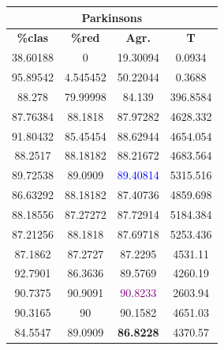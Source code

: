 \documentclass[11pt,a4paper]{article}
\theoremstyle{definition}
\begin{document}
\begin{tabbing}
{\begin{tabular}{|c|c|c|c|}
		\end{tabular}
		
		\begin{tabular}{|c|c|c|c|}
			\hline
			\multicolumn{4}{|c|}{\textbf{Parkinsons}} \\ \hline
			\textbf{\%clas} & \textbf{\%red} & \textbf{Agr.} & \textbf{T} \\ \hline 
			38.60188	&0	        &19.30094	&0.0934\\ \hline
95.89542&	4.545452	&50.22044	&0.3688\\ \hline
88.278	 & 79.99998	&84.139	  &396.8584\\ \hline
87.76384 & 88.1818 & 87.97282 & 4628.332\\ \hline
91.80432 & 85.45454 & 88.62944 & 4654.054\\ \hline
88.2517 & 88.18182 & 88.21672 & 4683.564\\ \hline
89.72538 & 89.0909 & \textcolor{blue}{89.40814} & 5315.516\\ \hline
86.63292 & 88.18182 & 87.40736 & 4859.698\\ \hline
88.18556 & 87.27272 & 87.72914 & 5184.384\\ \hline
87.21256 & 88.1818 & 87.69718 & 5253.436\\ \hline
87.1862 & 87.2727 & 87.2295 & 4531.11 \\ \hline
92.7901 & 86.3636 & 89.5769 & 4260.19 \\ \hline
90.7375 & 90.9091 & \textcolor{purple}{90.8233} & 2603.94 \\ \hline
90.3165 & 90 & 90.1582 & 4651.03 \\ \hline
84.5547 & 89.0909 & \textbf{86.8228} & 4370.57 \\ \hline


		\end{tabular}
		
}
\end{tabbing}
\end{document}
